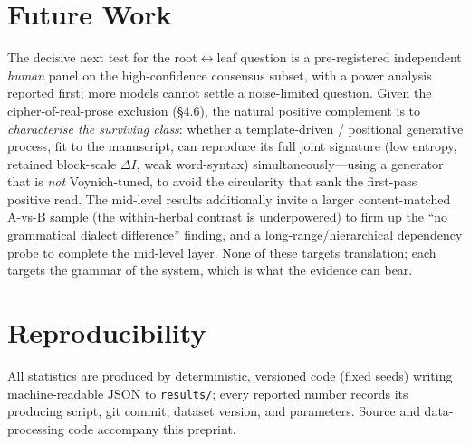 \documentclass[11pt]{article}
\begin{document}
\section{Future Work}
The decisive next test for the root$\leftrightarrow$leaf question is a pre-registered
independent \emph{human} panel on the high-confidence consensus subset, with a power
analysis reported first; more models cannot settle a noise-limited question. Given the
cipher-of-real-prose exclusion (\S4.6), the natural positive complement is to
\emph{characterise the surviving class}: whether a template-driven / positional
generative process, fit to the manuscript, can reproduce its full joint signature
(low entropy, retained block-scale $\Delta I$, weak word-syntax) simultaneously---using
a generator that is \emph{not} Voynich-tuned, to avoid the circularity that sank the
first-pass positive read. The mid-level results additionally invite a larger
content-matched A-vs-B sample (the within-herbal contrast is underpowered) to firm up
the ``no grammatical dialect difference'' finding, and a long-range/hierarchical
dependency probe to complete the mid-level layer. None of these targets translation;
each targets the grammar of the system, which is what the evidence can bear.

\section*{Reproducibility}
All statistics are produced by deterministic, versioned code (fixed seeds) writing
machine-readable JSON to \texttt{results/}; every reported number records its
producing script, git commit, dataset version, and parameters. Source and
data-processing code accompany this preprint.



\end{document}

